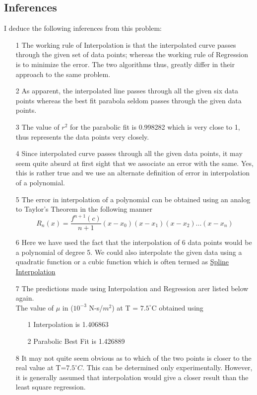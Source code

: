 \documentclass[titlepage, 11pt]{article}
\begin{document}
\subsection{Inferences}
I deduce the following inferences from this problem:
\begin{itemize}
    \item [1] The working rule of Interpolation is that the interpolated curve passes through the given set of data points; whereas the working rule of Regression is to minimize the error. The two algorithms thus, greatly differ in their approach to the same problem.
    \item [2] As apparent, the interpolated line passes through all the given six data points whereas the best fit parabola seldom passes through the given data points. 
    \item [3] The value of $r^2$ for the parabolic fit is 0.998282 which is very close to 1, thus represents the data points very closely.
    \item [4] Since interpolated curve passes through all the given data points, it may seem quite absurd at first sight that we associate an error with the same. Yes, this is rather true and we use an alternate definition of error in interpolation of a polynomial. 
    \item [5] The error in interpolation of a polynomial can be obtained using an analog to Taylor's Theorem in the following manner 
    \begin{equation}
    R_n(x) = \frac{f^{n+1}(c)}{n+1} (x-x_0)(x-x_1)(x-x_2)...(x-x_n) 
    \end{equation}
    \item [6] Here we have used the fact that the interpolation of 6 data points would be a polynomial of degree 5. We could also interpolate the given data using a quadratic function or a cubic function which is often termed as \href{https://en.wikipedia.org/wiki/Spline_interpolation}{Spline Interpolation}
    \item [7] The predictions made using Interpolation and Regression arer listed below again. \\
    The value of $\mu$ in ($10^{-3}$ N-s/$m^2$) at T = $7.5^{\circ}$C obtained using
  \begin{itemize}
    \item [1] Interpolation is 1.406863
    \item [2] Parabolic Best Fit is 1.426889
  \end{itemize}
  \item [8] It may not quite seem obvious as to which of the two points is closer to the real value at T=$7.5^{\circ}C$. This can be determined only experimentally. However, it is generally assumed that interpolation would give a closer result than the least square regression.

\end{itemize}
\end{document}

